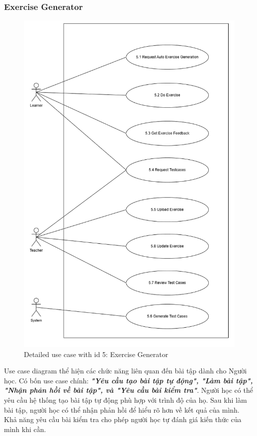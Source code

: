 \subsubsection{Exercise Generator}
\begin{figure}[H]
    \centering
    \includegraphics[scale=0.45]{Images/Usecase/usecase-Exercise Generator - Learner.drawio.png}
    \caption{Detailed use case with id 5: Exercise Generator}
    \label{fig:enter-label}
\end{figure}
\quad Use case diagram thể hiện các chức năng liên quan đến bài tập dành cho Người học. Có bốn use case chính:  \textbf{\textit{"Yêu cầu tạo bài tập tự động", "Làm bài tập", "Nhận phản hồi về bài tập", và "Yêu cầu bài kiểm tra"}}. Người học có thể yêu cầu hệ thống tạo bài tập tự động phù hợp với trình độ của họ. Sau khi làm bài tập, người học có thể nhận phản hồi để hiểu rõ hơn về kết quả của mình. Khả năng yêu cầu bài kiểm tra cho phép người học tự đánh giá kiến thức của mình khi cần.

